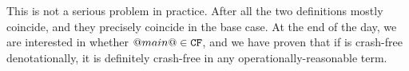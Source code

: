 \begin{comment}
 Consider the program:
\begin{code}
  loop = loop

  f :: (Bool -> Bool -> Bool) -> Bool
  f h = if (h True True) && (not (h False False))
        then if (h True loop) && (h loop True)
             then BAD else True
        else True
\end{code}
Also consider now this candidate contract for $f$:
\[ @f@ \in \CF -> (\CF -> \CF -> \CF) -> \CF \]
Under the \emph{operational} definition of contract satisfaction, 
@f@ indeed satisfies the contract.
To reach @BAD@ we have to pass both conditionals.
The first ensures that @h@ evaluates at least one of its
arguments, while the second will diverge if either argument is evaluated.
Hence @BAD@ cannot be reached, and the contract is satisfied. 

However, \emph{denotationally} it is possible to have the classic 
parallel-or function, $por$, defined as 
follows:
\[\begin{array}{lcl}
  por\;\bot\;\bot & = & \bot \\ 
  por\;\bot\;\injKZ{True} & = & \injKZ{True} \\
  por\;\injKZ{True}\;\bot & = & \injKZ{True} \\ 
  por\;\injKZ{False}\;\injKZ{False} & = & \injKZ{False}
\end{array}\] 
We have to define $por$ in the language of denotational semantics, because
we cannot write it in Haskell --- that is the point!  For convenience, 
though, we use pattern matching notation instead of our 
language of domain theory combinators.
The rest of the equations (for @BAD@ arguments) are induced by
monotonicity and we may pick whatever boolean value we like when both
arguments are @BAD@.

Now, this is denotationally a $\CF -> \CF -> \CF$ function, but it
will pass \emph{both} conditionals, 
yielding @BAD@. Hence $app(@f@,por) = \injBad$, and @f@'s contract does not hold.
So we have a concrete case where an expression may satisfy its
contract operationally but not denotationally, because of the usual
loss of full abstraction: there are more tests than programs in the denotational world. 
Due to contra-variance
we expect that the other inclusion will fail too. 
\end{comment}

This is not a serious problem in practice.
After all the two definitions mostly coincide, and
they precisely coincide in the base case.  At the end of the day, we
are interested in whether $@main@ \in {\tt CF}$, and we have proven that if
is crash-free denotationally, it is definitely crash-free in any
operationally-reasonable term.


